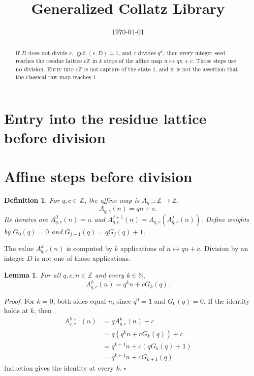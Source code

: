 \documentclass[11pt,letterpaper]{article}
\title{Generalized Collatz Library}
\author{}
\date{\today}
\newcommand{\N}{\mathbb{N}}
\newcommand{\Z}{\mathbb{Z}}
\newcommand{\Map}[3]{#1 \colon #2 \to #3}
\newtheorem{lemma}[theorem]{Lemma}
\newtheorem{definition}[theorem]{Definition}
\newenvironment{proof}{\noindent\textit{Proof.}}{\hfill\(\square\)}
\begin{document}
\maketitle
\section*{Entry into the residue lattice before division}

\begin{abstract}
If \(D\) does not divide \(c\), \(\gcd(c,D)=1\), and \(c\) divides \(q^k\), then every integer seed reaches the residue lattice \(c\Z\) in \(k\) steps of the affine map \(n\mapsto qn+c\). Those steps use no division. Entry into \(c\Z\) is not capture of the state \(1\), and it is not the assertion that the classical raw map reaches \(1\).
\end{abstract}

\section{Affine steps before division}

\begin{definition}
\label{def:affine}
For \(q,c\in\Z\), the affine map is \(\Map{A_{q,c}}{\Z}{\Z}\),
\[
A_{q,c}(n)=qn+c.
\]
Its iterates are \(A_{q,c}^{0}(n)=n\) and \(A_{q,c}^{j+1}(n)=A_{q,c}(A_{q,c}^{j}(n))\). Define weights by \(G_0(q)=0\) and \(G_{j+1}(q)=qG_j(q)+1\).
\end{definition}

The value \(A_{q,c}^{k}(n)\) is computed by \(k\) applications of \(n\mapsto qn+c\). Division by an integer \(D\) is not one of those applications.

\begin{lemma}
\label{lem:closed}
For all \(q,c,n\in\Z\) and every \(k\in\N\),
\[
A_{q,c}^{k}(n)=q^k n+cG_k(q).
\]
\end{lemma}

\begin{proof}
For \(k=0\), both sides equal \(n\), since \(q^0=1\) and \(G_0(q)=0\). If the identity holds at \(k\), then
\begin{align*}
A_{q,c}^{k+1}(n)
&=qA_{q,c}^{k}(n)+c\\
&=q(q^k n+cG_k(q))+c\\
&=q^{k+1}n+c(qG_k(q)+1)\\
&=q^{k+1}n+cG_{k+1}(q).
\end{align*}
Induction gives the identity at every \(k\).
\end{proof}
\end{document}
